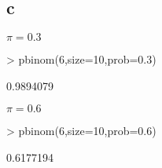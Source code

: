 \subsection{c}
$\pi = 0.3$
\begin{Schunk}
\begin{Sinput}
> pbinom(6,size=10,prob=0.3)
\end{Sinput}
\begin{Soutput}
[1] 0.9894079
\end{Soutput}
\end{Schunk}
$\pi = 0.6$
\begin{Schunk}
\begin{Sinput}
> pbinom(6,size=10,prob=0.6)
\end{Sinput}
\begin{Soutput}
[1] 0.6177194
\end{Soutput}
\end{Schunk}

